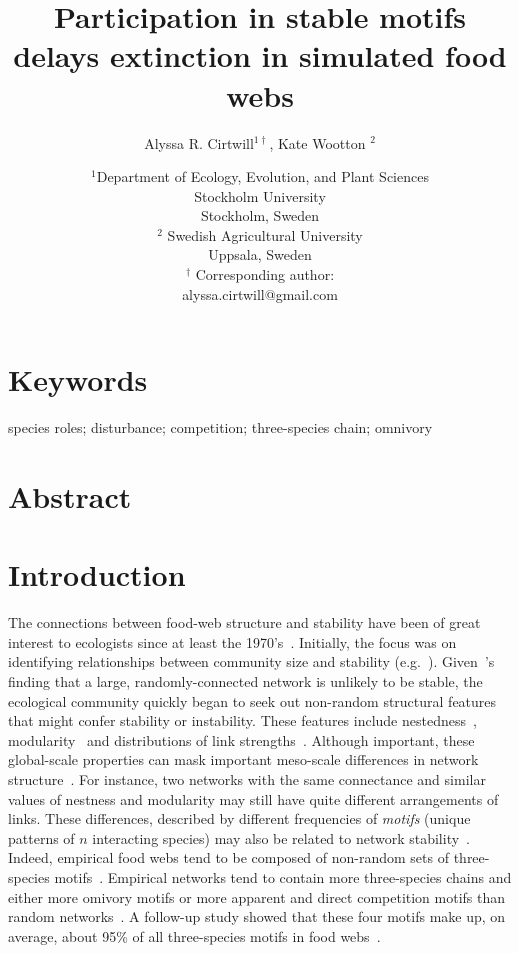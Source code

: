 \documentclass[12pt]{article}
\title{Participation in stable motifs delays extinction in simulated food webs}
\author{Alyssa R. Cirtwill$^{1\dagger}$, Kate Wootton $^{2}$}
\date{\small$^1$Department of Ecology, Evolution, and Plant Sciences\\ 
Stockholm University\\
Stockholm, Sweden\\
\medskip
\small$^2$ Swedish Agricultural University\\
Uppsala, Sweden\\
\medskip
$^\dagger$ Corresponding author:\\
alyssa.cirtwill@gmail.com\\
 }
\begin{document}
 
\maketitle 
\raggedright
\setlength{\parindent}{15pt} 


\section{Keywords}

	species roles; disturbance; competition; three-species chain; omnivory


\section{Abstract}


\section{Introduction}

	The connections between food-web structure and stability have been of great interest to ecologists since at least the 1970's~\citep{May1972}. Initially, the focus was on identifying relationships between community size and stability (e.g.~\citealp{Gardner1970,May1972}). Given~\citet{May1972}'s finding that a large, randomly-connected network is unlikely to be stable, the ecological community quickly began to seek out non-random structural features that might confer stability or instability. These features include nestedness~\citep{Allesina2012,Sauve2014}, modularity~\citep{Sauve2014,Thebault2010} and distributions of link strengths~\citep{McCann1998,Gross2009,Rooney2012,Wootton2016}. Although important, these global-scale properties can mask important meso-scale differences in network structure~\citep{Simmons2018a}. For instance, two networks with the same connectance and similar values of nestness and modularity may still have quite different arrangements of links. These differences, described by different frequencies of \emph{motifs} (unique patterns of $n$ interacting species) may also be related to network stability~\citep{Prill2005,Borrelli2015,Monteiro2016}. Indeed, empirical food webs tend to be composed of non-random sets of three-species motifs~\citep{Stouffer2007}. Empirical networks tend to contain more three-species chains and either more omivory motifs or more apparent and direct competition motifs than random networks~\citep{Stouffer2007}. A follow-up study showed that these four motifs make up, on average, about 95\% of all three-species motifs in food webs~\citep{Stouffer2010b}. 
\end{document}

